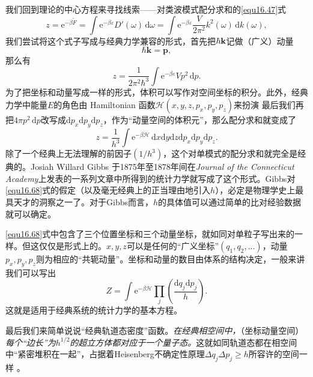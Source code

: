 我们回到理论的中心方程来寻找线索——对类波模式配分求和的\eqref{equ16.47}式
\begin{equation}
z=\mathrm e^{-\beta\tilde F}=\int\mathrm e^{-\beta\varepsilon}D'(\omega)\,\mathrm d\omega = \int\mathrm e^{-\beta\varepsilon}\frac{V}{2\pi^2}k^2(\omega)\,\mathrm dk(\omega),
\end{equation}
我们尝试将这个式子写成与经典力学兼容的形式，首先把$\hbar\bf k$记做（广义）动量
\begin{equation}
\hbar {\mathbf k} = {\mathbf p},
\end{equation}
那么有
\begin{equation}
z=\frac{1}{2\pi^2\hbar^3}\int\mathrm e^{-\beta\varepsilon}Vp^2\,\mathrm dp.
\end{equation}
为了把坐标和动量写成一样的形式，体积可以写作对空间坐标的积分。此外，经典力学中能量$E$的角色由 Hamiltonian 函数$\mathscr H(x,y,z,p_x,p_y,p_z)$来扮演%
%
最后我们再把$4\pi p^2\,\mathrm dp$改写成$\mathrm dp_x\mathrm dp_y\mathrm dp_z$，作为``动量空间的体积元''，那么配分求和就变成了
\begin{equation}
z=\frac{1}{h^3}\int \mathrm e^{-\beta\mathscr H}\,\mathrm dx\mathrm dy\mathrm dz\mathrm dp_x\mathrm dp_y\mathrm dp_z.
\label{equ16.68}
\end{equation}
除了一个经典上无法理解的前因子$(1/h^3)$，这个对单模式的配分求和就完全是经典的。Josiah Willard Gibbs 于1875年至1878年间在{\it Journal of the Connecticut Academy}上发表的一系列文章中所得到的统计力学就写成了这个形式。Gibbs对\eqref{equ16.68}式的假定（以及毫无经典上的正当理由地引入$h$），必定是物理学史上最具天才的洞察之一了。对于Gibbs而言，$h$的具体值可以通过简单的比对经验数据就可以确定。

\eqref{equ16.68}式中包含了三个位置坐标和三个动量坐标，就如同对单粒子写出来的一样。但这仅仅是形式上的。$x,y,z$可以是任何的``广义坐标''$(q_1,q_2,\dots)$，动量$p_x,p_y,p_z$则为相应的``共轭动量''。坐标和动量的数目由体系的结构决定，一般来讲我们可以写出
\begin{equation}
Z=\int\mathrm e^{-\beta\mathscr H}\prod\limits_j\left(\frac{\mathrm dq_j\mathrm dp_j}{h}\right).
\label{equ16.69}
\end{equation}
这就是适用于经典系统的统计力学的基本方程。

最后我们来简单说说``经典轨道态密度''函数。{\it 在经典相空间中，}（坐标动量空间）{\it 每个``边长''为$h^{1/2}$的超立方体都对应于一个量子态。}这就如同轨道态都在相空间中``紧密堆积在一起''，占据着Heisenberg不确定性原理$\Delta q_j\Delta p_j\ge h$所容许的空间一样%
%
。

